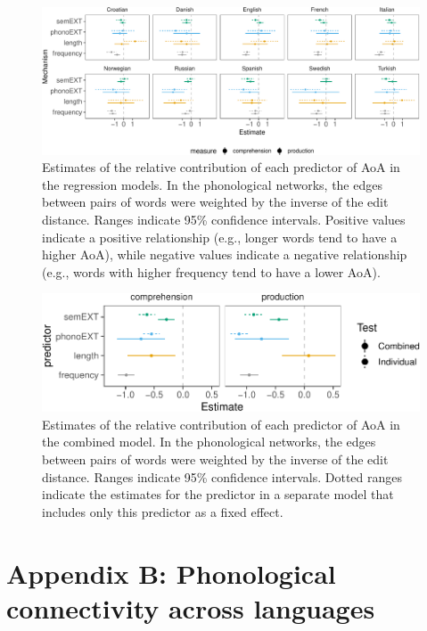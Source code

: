 \documentclass[english,,man,floatsintext]{apa6}
\begin{document}
\begin{figure}[!h]
\includegraphics[width=\textwidth]{ms_files/figure-latex/staticPrednt-1} \caption{Estimates of the relative contribution of each predictor of AoA in the regression models. In the phonological networks, the edges between pairs of words were weighted by the inverse of the edit distance. Ranges indicate 95\% confidence intervals. Positive values indicate a positive relationship (e.g., longer words tend to have a higher AoA), while negative values indicate a negative relationship (e.g., words with higher frequency tend to have a lower AoA).}\label{fig:staticPrednt}
\end{figure}

\begin{figure}[!h]
\includegraphics[width=\textwidth]{ms_files/figure-latex/staticAllnt-1} \caption{Estimates of the relative contribution of each predictor of AoA in the combined model. In the phonological networks, the edges between pairs of words were weighted by the inverse of the edit distance. Ranges indicate 95\% confidence intervals. Dotted ranges indicate the estimates for the predictor in a separate model that includes only this predictor as a fixed effect.}\label{fig:staticAllnt}
\end{figure}

\clearpage

\hypertarget{appendix-b-phonological-connectivity-across-languages}{%
\section{Appendix B: Phonological connectivity across languages}\label{appendix-b-phonological-connectivity-across-languages}}
\end{document}
